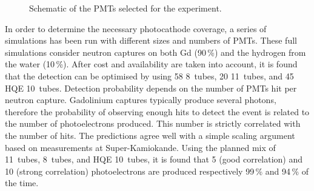  \begin{figure}
   \centering
    \hfill
    \hfill
   \caption{Schematic of the PMTs selected for the experiment.}
   \label{fig:pmt}
 \end{figure}

 In order to determine the necessary photocathode coverage, a series of simulations has been run %
 with different sizes and numbers of PMTs.
 These full simulations consider neutron captures on both Gd (90\,\%) and the hydrogen from %
 the water (10\,\%).
 After cost and availability are taken into account, it is found that the detection can be %
 optimised by using 58 8\inch~tubes, 20 11\inch~tubes, and 45 HQE 10\inch~tubes.
 Detection probability depends on the number of PMTs hit per neutron capture. 
 Gadolinium captures typically produce several photons, therefore the probability of observing %
 enough hits to detect the event is related to the number of photoelectrons produced.
 This number is strictly correlated with the number of hits.
 The predictions agree well with a simple scaling argument based on measurements %
 at Super-Kamiokande.
 Using the planned mix of 11\inch~tubes, 8\inch~tubes, and HQE 10\inch~tubes, it is found that %
 5 (good correlation) and 10 (strong correlation) photoelectrons are produced respectively %
 99\,\% and 94\,\% of the time.
 
